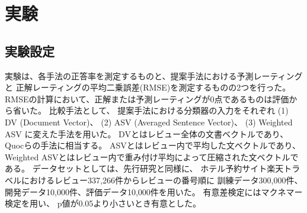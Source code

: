 \section{実験}

\subsection{実験設定}

実験は、各手法の正答率を測定するものと、提案手法における予測レーティングと
正解レーティングの平均二乗誤差(RMSE)を測定するものの2つを行った。
RMSEの計算において、正解または予測レーティングが0点であるものは評価から省いた。
比較手法として、
提案手法における分類器の入力をそれぞれ
(1) DV (Document Vector)、
(2) ASV (Averaged Sentence Vector)、
(3) Weighted ASV
に変えた手法を用いた。
DVとはレビュー全体の文書ベクトルであり、
Quocら\cite{quoc14}の手法に相当する。
ASVとはレビュー内で平均した文ベクトルであり、
Weighted ASVとはレビュー内で重み付け平均によって圧縮された文ベクトルである。
データセットとしては、先行研究\cite{fujitani15}と同様に、
ホテル予約サイト楽天トラベルにおけるレビュー337,266件からレビューの番号順に
訓練データ300,000件、開発データ10,000件、評価データ10,000件を用いた。
有意差検定にはマクネマー検定を用い、
p値が0.05より小さいとき有意とした。



